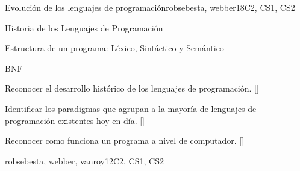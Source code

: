 \begin{syllabus}
\begin{unit}{}{Evolución de los lenguajes de programación}{robsebesta, webber}{18}{C2, CS1, CS2}
\begin{topics}
	\item Historia de los Lenguajes de Programación
	\item \PLProgramRepresentationTopicPrograms
	\item \PLProgramRepresentationTopicData
	\item Estructura de un programa: Léxico, Sintáctico y Semántico
	\item BNF
	\item \PLLanguageTranslationandExecutionTopicInterpretation [\Familiarity]
\end{topics}
\begin{learningoutcomes}
	\item Reconocer el desarrollo histórico de los lenguajes de programación. [\Familiarity]
	\item Identificar los paradigmas que agrupan a la mayoría de lenguajes de programación existentes hoy en día. [\Familiarity]
	\item \PLProgramRepresentationLOExplainHowProcess [\Familiarity]
	\item \PLProgramRepresentationLODescribeAnTree [\Familiarity]
	\item \PLProgramRepresentationLOWriteAProcess [\Usage]	
	\item \PLLanguageTranslationandExecutionLODistinguishA [\Familiarity]
	\item Reconocer como funciona un programa a nivel de computador. [\Familiarity]
\end{learningoutcomes}
\end{unit}

\begin{unit}{\PLLanguagePragmatics}{}{robsebesta, webber, vanroy}{12}{C2, CS1, CS2}
\begin{topics}%
    \item \PLLanguagePragmaticsTopicPrinciples
    \item \PLLanguagePragmaticsTopicEvaluation
    \item \PLLanguagePragmaticsTopicEager
    \item \PLLanguagePragmaticsTopicDefining
    \item \PLLanguagePragmaticsTopicExternal
\end{topics}
\begin{learningoutcomes}%
    \item \PLLanguagePragmaticsLODiscussTheConcepts [\Usage]
    \item \PLLanguagePragmaticsLOUseCrisp [\Usage]
    \item \PLLanguagePragmaticsLOGiveAnWhose [\Usage]
    \item \PLLanguagePragmaticsLOShowUses [\Familiarity]
    \item \PLLanguagePragmaticsLODiscussTheAllowing [\Familiarity] %
\end{learningoutcomes}%
\end{unit}


\end{syllabus}

